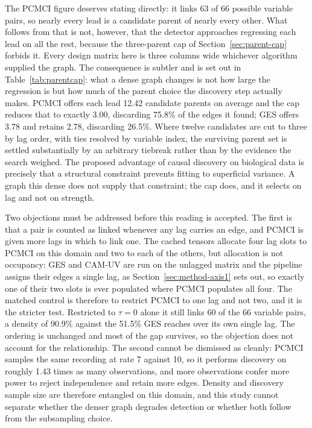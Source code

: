 The PCMCI figure deserves stating directly: it links 63 of 66 possible variable pairs, so nearly every lead is a candidate parent of nearly every other. What follows from that is not, however, that the detector approaches regressing each lead on all the rest, because the three-parent cap of Section~\ref{sec:parent-cap} forbids it. Every design matrix here is three columns wide whichever algorithm supplied the graph. The consequence is subtler and is set out in Table~\ref{tab:parentcap}: what a dense graph changes is not how large the regression is but how much of the parent choice the discovery step actually makes. PCMCI offers each lead 12.42 candidate parents on average and the cap reduces that to exactly 3.00, discarding 75.8\% of the edges it found; GES offers 3.78 and retains 2.78, discarding 26.5\%. Where twelve candidates are cut to three by lag order, with ties resolved by variable index, the surviving parent set is settled substantially by an arbitrary tiebreak rather than by the evidence the search weighed. The proposed advantage of causal discovery on biological data is precisely that a structural constraint prevents fitting to superficial variance. A graph this dense does not supply that constraint; the cap does, and it selects on lag and not on strength.

Two objections must be addressed before this reading is accepted. The first is that a pair is counted as linked whenever any lag carries an edge, and PCMCI is given more lags in which to link one. The cached tensors allocate four lag slots to PCMCI on this domain and two to each of the others, but allocation is not occupancy: GES and CAM-UV are run on the unlagged matrix and the pipeline assigns their edges a single lag, as Section~\ref{sec:method-axis1} sets out, so exactly one of their two slots is ever populated where PCMCI populates all four. The matched control is therefore to restrict PCMCI to one lag and not two, and it is the stricter test. Restricted to $\tau = 0$ alone it still links 60 of the 66 variable pairs, a density of 90.9\% against the 51.5\% GES reaches over its own single lag. The ordering is unchanged and most of the gap survives, so the objection does not account for the relationship. The second cannot be dismissed as cleanly: PCMCI samples the same recording at rate 7 against 10, so it performs discovery on roughly 1.43 times as many observations, and more observations confer more power to reject independence and retain more edges. Density and discovery sample size are therefore entangled on this domain, and this study cannot separate whether the denser graph degrades detection or whether both follow from the subsampling choice.

